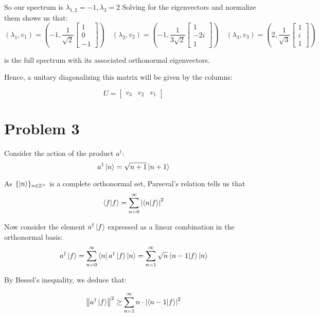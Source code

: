 \documentclass[12pt]{article}%
\begin{document}
So our spectrum is $\lambda_{1,2} = -1, \lambda_3 = 2$
Solving for the eigenvectors and normalize them shows us that:
\[ (\lambda_1, v_1) = (-1,\frac{1}{\sqrt{2}}\begin{bmatrix}
                    1 \\ 0 \\ -1
                  \end{bmatrix})
                  \quad  (\lambda_2, v_2) = (-1, \frac{1}{3\sqrt{2}}\begin{bmatrix}
                                      1 \\ -2i \\ 1
                                    \end{bmatrix})
                   \quad  (\lambda_3, v_3) = (2,\frac{1}{\sqrt{3}} \begin{bmatrix}
                    1 \\ i \\ 1
                  \end{bmatrix}) \]

is the full spectrum with its associated orthonormal eigenvectors.

Hence, a unitary diagonalizing this matrix will be given by the columns:

\begin{equation*}
 U = \begin{bmatrix}
    v_3 & v_2 & v_1
\end{bmatrix}
\end{equation*}

\section{Problem 3}

Consider the action of the product $a^\dagger$: $$ a^\dagger\ket{n} = \sqrt{n+1}\ket{n+1} $$

As $\{\ket{n}\}_{n \in \mathbb{Z^+}}$ is a complete orthonormal set, Parseval's relation tells us that
\[ \ip{f}{f} = \sum_{n = 0}^\infty \abs{\bra{n}\ket{f}}^2\]

Now consider the element $a^\dagger \ket{f}$ expressed as a linear combination in the orthonormal basis:
\[a^\dagger \ket{f} =  \sum_{n = 0}^\infty \bra{n}a^\dagger\ket{f}\ket{n} =   \sum_{n = 1}^\infty \sqrt{n}\bra{n-1}\ket{f}\ket{n} \]

By Bessel's inequality, we deduce that:

\[\norm{a^\dagger \ket{f} }^2 \geq  \sum_{n = 1}^\infty n\cdot \abs{\bra{n-1} \ket{f}}^2  \]
\end{document}
